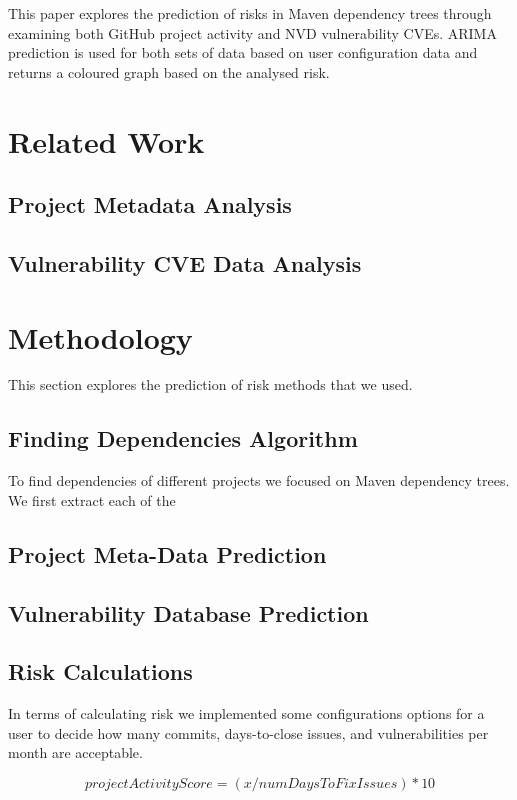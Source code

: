 \documentclass[10pt, onecolumn]{IEEEtran}
\begin{document}
This paper explores the prediction of risks in Maven dependency trees through examining both GitHub project activity and NVD vulnerability CVEs. ARIMA prediction is used for both sets of data based on user configuration data and returns a coloured graph based on the analysed risk. 

\section{Related Work}

\subsection{Project Metadata Analysis}


\subsection{Vulnerability CVE Data Analysis}

\section{Methodology}
This section explores the prediction of risk methods that we used.

\subsection{Finding Dependencies Algorithm}
To find dependencies of different projects we focused on Maven dependency trees. We first extract each of the 

\subsection{Project Meta-Data Prediction}

\subsection{Vulnerability Database Prediction}

\subsection{Risk Calculations}
In terms of calculating risk we implemented some configurations options for a user to decide how many commits, days-to-close issues, and vulnerabilities per month are acceptable. 


\[ projectActivityScore = ( x / numDaysToFixIssues ) * 10\]
\end{document}
